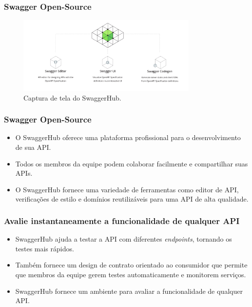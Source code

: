 \documentclass{beamer}
\begin{document}
\begin{frame}
  \frametitle{Swagger Open-Source}

    \begin{figure}
      \includegraphics[width=0.8\textwidth]{assets/aula-tads-pdwa5-15-06-2023/SwaggerHub-screenshot.png}
      \caption{Captura de tela do SwaggerHub.}
    \end{figure}

  \end{frame}
    
  

    \begin{frame}
      \frametitle{Swagger Open-Source}    

  \begin{itemize}
    \item O SwaggerHub oferece uma plataforma profissional para o desenvolvimento de sua API.
    \item Todos os membros da equipe podem colaborar facilmente e compartilhar suas APIs.
    \item O SwaggerHub fornece uma variedade de ferramentas como editor de API, verificações de estilo e domínios reutilizáveis para uma API de alta qualidade.
  \end{itemize}
\end{frame}


\begin{frame}
\frametitle{Avalie instantaneamente a funcionalidade de qualquer API}


\begin{itemize}
\item SwaggerHub ajuda a testar a API com diferentes \textit{endpoints}, tornando os testes mais rápidos.
\item Também fornece um design de contrato orientado ao consumidor que permite que membros da equipe gerem testes automaticamente e monitorem serviços.
\item SwaggerHub fornece um ambiente para avaliar a funcionalidade de qualquer API.
\end{itemize}

\end{frame}
\end{document}
